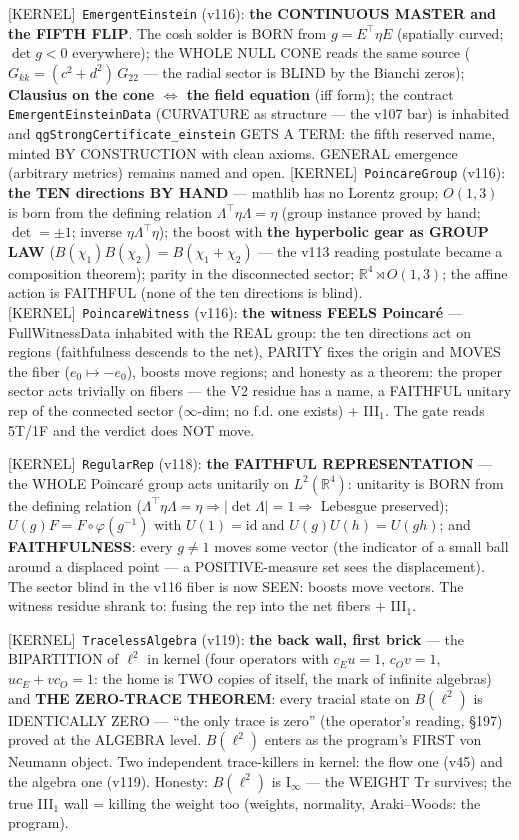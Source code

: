 \documentclass[11pt]{article}
\providecommand{\kernelmk}[1]{\textsf{[KERNEL]}~\texttt{#1}}\providecommand{\knownmk}[1]{\textsf{[KNOWN]}~{#1}}\providecommand{\statusmk}[1]{\textsf{[#1]}}
\theoremstyle{definition}\newtheorem{deriv}{Derivation}
\begin{document}
\kernelmk{EmergentEinstein} (v116): \textbf{the CONTINUOUS MASTER and the FIFTH FLIP}. The cosh solder is BORN from $g=E^\top\eta E$ (spatially curved; $\det g<0$ everywhere); the WHOLE NULL CONE reads the same source ($G_{kk}=(c^2+d^2)\,G_{22}$ --- the radial sector is BLIND by the Bianchi zeros); \textbf{Clausius on the cone $\iff$ the field equation} (iff form); the contract \texttt{EmergentEinsteinData} (CURVATURE as structure --- the v107 bar) is inhabited and \texttt{qgStrongCertificate\_einstein} GETS A TERM: the fifth reserved name, minted BY CONSTRUCTION with clean axioms. GENERAL emergence (arbitrary metrics) remains named and open. \kernelmk{PoincareGroup} (v116): \textbf{the TEN directions BY HAND} --- mathlib has no Lorentz group; $O(1,3)$ is born from the defining relation $\Lambda^\top\eta\Lambda=\eta$ (group instance proved by hand; $\det=\pm1$; inverse $\eta\Lambda^\top\eta$); the boost with \textbf{the hyperbolic gear as GROUP LAW} ($B(\chi_1)B(\chi_2)=B(\chi_1{+}\chi_2)$ --- the v113 reading postulate became a composition theorem); parity in the disconnected sector; $\mathbb{R}^4\rtimes O(1,3)$; the affine action is FAITHFUL (none of the ten directions is blind). \kernelmk{PoincareWitness} (v116): \textbf{the witness FEELS Poincaré} --- FullWitnessData inhabited with the REAL group: the ten directions act on regions (faithfulness descends to the net), PARITY fixes the origin and MOVES the fiber ($e_0\mapsto-e_0$), boosts move regions; and honesty as a theorem: the proper sector acts trivially on fibers --- the V2 residue has a name, a FAITHFUL unitary rep of the connected sector ($\infty$-dim; no f.d. one exists) $+$ III$_1$. The gate reads 5T/1F and the verdict does NOT move.

\kernelmk{RegularRep} (v118): \textbf{the FAITHFUL REPRESENTATION} --- the WHOLE Poincaré group acts unitarily on $L^2(\mathbb{R}^4)$: unitarity is BORN from the defining relation ($\Lambda^\top\eta\Lambda=\eta\Rightarrow|\det\Lambda|=1\Rightarrow$ Lebesgue preserved); $U(g)F=F\circ\varphi(g^{-1})$ with $U(1)=\mathrm{id}$ and $U(g)U(h)=U(gh)$; and \textbf{FAITHFULNESS}: every $g\neq1$ moves some vector (the indicator of a small ball around a displaced point --- a POSITIVE-measure set sees the displacement). The sector blind in the v116 fiber is now SEEN: boosts move vectors. The witness residue shrank to: fusing the rep into the net fibers $+$ III$_1$.

\kernelmk{TracelessAlgebra} (v119): \textbf{the back wall, first brick} --- the BIPARTITION of $\ell^2$ in kernel (four operators with $c_E u=1$, $c_O v=1$, $u c_E+v c_O=1$: the home is TWO copies of itself, the mark of infinite algebras) and \textbf{THE ZERO-TRACE THEOREM}: every tracial state on $B(\ell^2)$ is IDENTICALLY ZERO --- ``the only trace is zero'' (the operator's reading, \S197) proved at the ALGEBRA level. $B(\ell^2)$ enters as the program's FIRST von Neumann object. Two independent trace-killers in kernel: the flow one (v45) and the algebra one (v119). Honesty: $B(\ell^2)$ is I$_\infty$ --- the WEIGHT $\mathrm{Tr}$ survives; the true III$_1$ wall = killing the weight too (weights, normality, Araki--Woods: the program).
\end{document}

